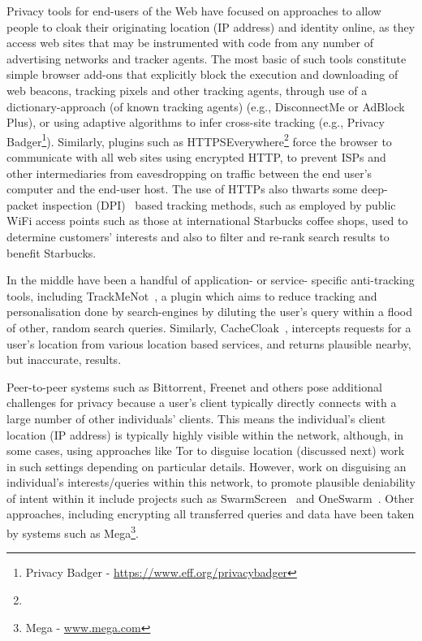 \documentclass{IOS-Book-Article}     %
\begin{document}
Privacy tools for end-users of the Web have focused on approaches to allow people to cloak their originating location (IP address) and identity online, as they access web sites that may be instrumented with code from any number of advertising networks and tracker agents.  The most basic of such tools constitute simple browser add-ons that explicitly block the execution and downloading of web beacons, tracking pixels and other tracking agents, through use of a dictionary-approach (of known tracking agents) (e.g., DisconnectMe or AdBlock Plus), or using adaptive algorithms to infer cross-site tracking (e.g., Privacy Badger\footnote{Privacy Badger - \url{https://www.eff.org/privacybadger}}).  Similarly, plugins such as HTTPSEverywhere\footnote{} force the browser to communicate with all web sites using encrypted HTTP, to prevent ISPs and other intermediaries from eavesdropping on traffic between the end user's computer and the end-user host.  The use of HTTPs also thwarts some deep-packet inspection (DPI)~\cite{kumar2006advanced} based tracking methods, such as employed by public WiFi access points such as those at international Starbucks coffee shops, used to determine customers' interests and also to filter and re-rank search results to benefit Starbucks.

In the middle have been a handful of application- or service- specific anti-tracking tools, including TrackMeNot~\cite{howe2009trackmenot}, a plugin which aims to reduce tracking and personalisation done by search-engines by diluting the user's query within a flood of other, random search queries. Similarly, CacheCloak~\cite{Meyerowitz:2009:HSF:1614320.1614358}, intercepts requests for a user's location from various location based services, and returns plausible nearby, but inaccurate, results.  

Peer-to-peer systems such as Bittorrent, Freenet and others pose additional challenges for privacy because a user's client typically directly connects with a large number of other individuals' clients.  This means the individual's client location (IP address) is typically highly visible within the network, although, in some cases, using approaches like Tor to disguise location (discussed next) work in such settings depending on particular details.  However, work on disguising an individual's interests/queries within this network, to promote plausible deniability of intent within it include projects such as SwarmScreen~\cite{choffnes2009swarmscreen} and OneSwarm~\cite{Isdal:2010:PPD:1851182.1851198}.  Other approaches, including encrypting all transferred queries and data have been taken by systems such as Mega\footnote{Mega - \url{www.mega.com}}.
\end{document}
